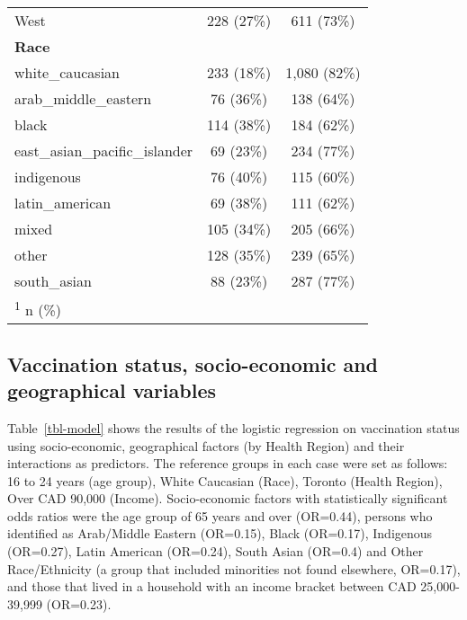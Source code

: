 \documentclass[
  letterpaper,
  DIV=11,
  numbers=noendperiod]{scrartcl}
\begin{document}
\begin{table}
\begin{tabular}{lcc}
\hspace{1em}West & 228 (27\%) & 611 (73\%)\\
\textbf{Race} &  & \\
\addlinespace
\hspace{1em}white\_caucasian & 233 (18\%) & 1,080 (82\%)\\
\hspace{1em}arab\_middle\_eastern & 76 (36\%) & 138 (64\%)\\
\hspace{1em}black & 114 (38\%) & 184 (62\%)\\
\hspace{1em}east\_asian\_pacific\_islander & 69 (23\%) & 234 (77\%)\\
\hspace{1em}indigenous & 76 (40\%) & 115 (60\%)\\
\addlinespace
\hspace{1em}latin\_american & 69 (38\%) & 111 (62\%)\\
\hspace{1em}mixed & 105 (34\%) & 205 (66\%)\\
\hspace{1em}other & 128 (35\%) & 239 (65\%)\\
\hspace{1em}south\_asian & 88 (23\%) & 287 (77\%)\\
\bottomrule
\multicolumn{3}{l}{\rule{0pt}{1em}\textsuperscript{1} n (\%)}\\
\end{tabular}
\endgroup{}
\end{table}

\hypertarget{vaccination-status-socio-economic-and-geographical-variables}{%
\subsection{Vaccination status, socio-economic and geographical
variables}\label{vaccination-status-socio-economic-and-geographical-variables}}

Table~\ref{tbl-model} shows the results of the logistic regression on
vaccination status using socio-economic, geographical factors (by Health
Region) and their interactions as predictors. The reference groups in
each case were set as follows: 16 to 24 years (age group), White
Caucasian (Race), Toronto (Health Region), Over CAD 90,000 (Income).
Socio-economic factors with statistically significant odds ratios were
the age group of 65 years and over (OR=0.44), persons who identified as
Arab/Middle Eastern (OR=0.15), Black (OR=0.17), Indigenous (OR=0.27),
Latin American (OR=0.24), South Asian (OR=0.4) and Other Race/Ethnicity
(a group that included minorities not found elsewhere, OR=0.17), and
those that lived in a household with an income bracket between CAD
25,000-39,999 (OR=0.23).
\end{document}
